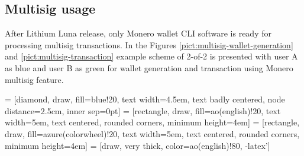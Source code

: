 \documentclass[
  printed, %
  table,   %
  lof,     %
  lot,     %
           oneside, color
]{fithesis3}
\begin{document}
\subsection{Multisig usage}
After Lithium Luna release, only Monero wallet CLI software is ready for processing multisig transactions. In the Figures \ref{pict:multisig-wallet-generation} and \ref{pict:multisig-transaction} example scheme of 2-of-2 is presented with user A as blue and user B as green for wallet generation and transaction using Monero multisig feature. 


\newpage
{}
 = [diamond, draw, fill=blue!20,
    text width=4.5em, text badly centered, node distance=2.5cm, inner sep=0pt]
 = [rectangle, draw, fill=ao(english)!20,
    text width=5em, text centered, rounded corners, minimum height=4em]
 = [rectangle, draw, fill=azure(colorwheel)!20,
    text width=5em, text centered, rounded corners, minimum height=4em]
 = [draw, very thick, color=ao(english)!80, -latex']
\end{document}
